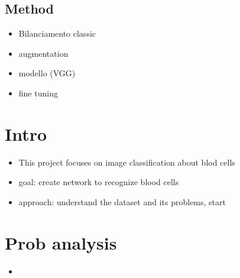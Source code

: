 \documentclass[11pt]{article}
\begin{document}
\begin{multicols*}{2}
        \section{Method} 
        \begin{itemize}
            \item Bilanciamento classic
            \item augmentation
            \item modello (VGG)
            \item fine tuning
        \end{itemize}

        
        
    
    \end{multicols*}

    \newpage

    \section{Intro}

    \begin{itemize}
        \item This project focuses on image classification about blod cells
        \item goal: create network to recognize blood cells
        \item approach: understand the dataset and its problems, start
    \end{itemize}

    \section{Prob analysis} 

    \begin{itemize}
        \item 
    \end{itemize}
\end{document}

